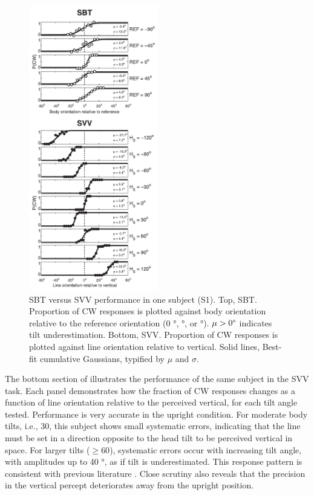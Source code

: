 \begin{figure}
    \includegraphics[width=0.5\textwidth]{src/paper1/figure3.pdf}
    
    \caption{SBT versus SVV performance in one subject (S1). Top, SBT. Proportion of CW responses is plotted against body orientation relative to the reference orientation (0 \si{\degree},  \si{\degree}, or  \si{\degree}). $\mu > 0\degree$ indicates tilt underestimation. Bottom, SVV. Proportion of CW responses is plotted against line orientation relative to vertical. Solid lines, Best-fit cumulative Gaussians, typified by $\mu$ and $\sigma$.}  
    \label{p1:fig3}
\end{figure}

The bottom section of  illustrates the performance of the same subject in the SVV task. Each panel demonstrates how the fraction of CW responses changes as a function of line orientation relative to the perceived vertical, for each tilt angle tested. Performance is very accurate in the upright condition. For moderate body tilts, i.e., 30\textdegree, this subject shows small systematic errors, indicating that the line must be set in a direction opposite to the head tilt to be perceived vertical in space. For larger tilts ($\ge 60$), systematic errors occur with increasing tilt angle, with amplitudes up to 40 \si{\degree}, as if tilt is underestimated. This response pattern is consistent with previous literature \cite{aubert1861, udodehaes1970, mittelstaedt1983, vanbeuzekom2000}. Close scrutiny also reveals that the precision in the vertical percept deteriorates away from the upright position. 


